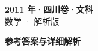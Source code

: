 \documentclass[zihao=-4, a4paper]{ctexart}
\begin{document}
\begin{center}
  {\Large\bfseries 2011 年·四川卷·文科}\\[4pt]
  {\large 数学 · 解析版}
\end{center}
\medskip
{}

\clearpage
{}
\begin{center}{\Large\bfseries 参考答案与详细解析}\end{center}
\medskip

\end{document}
